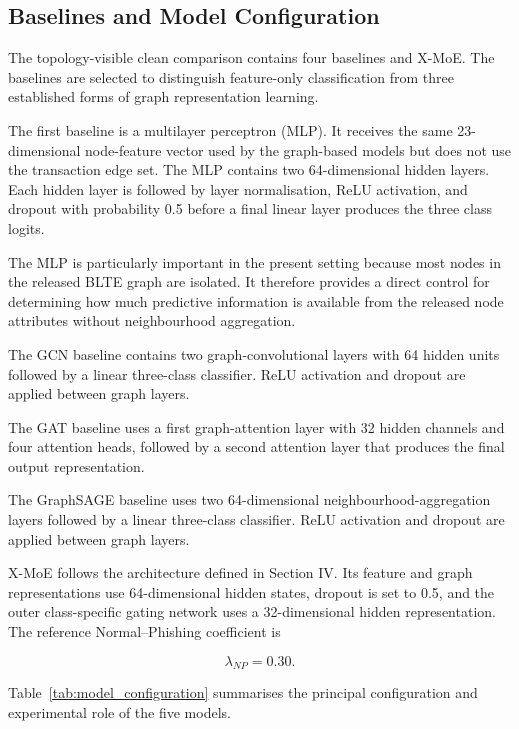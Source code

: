 \documentclass{ieeeaccess}
\begin{document}
\subsection{Baselines and Model Configuration}

The topology-visible clean comparison contains four baselines and X-MoE. The baselines are selected to distinguish feature-only classification from three established forms of graph representation learning.

The first baseline is a multilayer perceptron (MLP). It receives the same 23-dimensional node-feature vector used by the graph-based models but does not use the transaction edge set. The MLP contains two 64-dimensional hidden layers. Each hidden layer is followed by layer normalisation, ReLU activation, and dropout with probability 0.5 before a final linear layer produces the three class logits.

The MLP is particularly important in the present setting because most nodes in the released BLTE graph are isolated. It therefore provides a direct control for determining how much predictive information is available from the released node attributes without neighbourhood aggregation.

The GCN baseline contains two graph-convolutional layers with 64 hidden units followed by a linear three-class classifier. ReLU activation and dropout are applied between graph layers.

The GAT baseline uses a first graph-attention layer with 32 hidden channels and four attention heads, followed by a second attention layer that produces the final output representation.

The GraphSAGE baseline uses two 64-dimensional neighbourhood-aggregation layers followed by a linear three-class classifier. ReLU activation and dropout are applied between graph layers.

X-MoE follows the architecture defined in Section IV. Its feature and graph representations use 64-dimensional hidden states, dropout is set to 0.5, and the outer class-specific gating network uses a 32-dimensional hidden representation. The reference Normal--Phishing coefficient is

\begin{equation}
\lambda_{NP}=0.30.
\end{equation}

Table~\ref{tab:model_configuration} summarises the principal configuration and experimental role of the five models.
\end{document}
